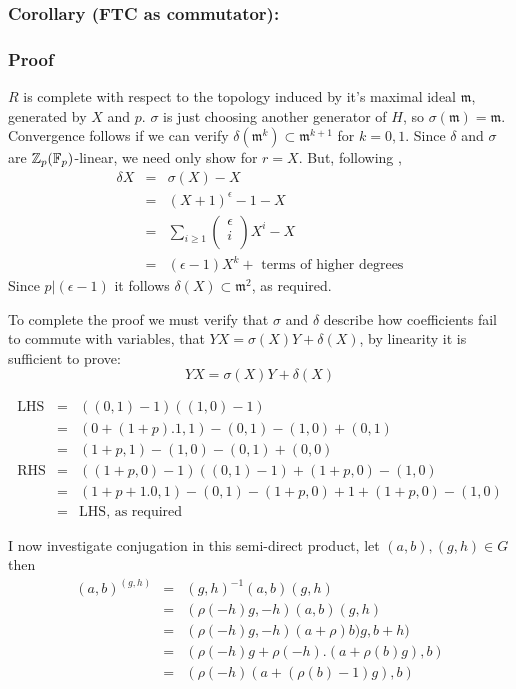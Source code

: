 \subsubsection{Corollary (FTC as commutator):} 

\subsubsection*{Proof}
$R$ is complete with respect to the topology induced by it's maximal ideal $\mathfrak m$, generated by $X$ and $p$. $\sigma$ is just choosing another generator of $H$, so $\sigma(\mathfrak m)= \mathfrak m$. Convergence follows if we can verify $\delta(\mathfrak m^k)\subset \mathfrak m^{k+1}$ for $k=0,1$. Since $\delta$ and $\sigma$ are $\mathbb Z_p (\mathbb F_p)$-linear, we need only show for $r=X$. But, following \cite{V},
\begin{eqnarray}
\nonumber \delta X &=& \sigma(X) - X\\
\nonumber               &=& (X+1)^\epsilon - 1- X\\
\nonumber    	       &=& \sum_{i\geq 1} \left( \begin{array}{c}\epsilon \\ i\\ \end{array}\right) X^i - X\\
\nonumber 	       &=& (\epsilon - 1) X^k +\text{ terms of higher degrees}
\end{eqnarray}
Since $p| (\epsilon - 1)$ it follows $\delta(X)\subset \mathfrak m ^2$, as required.

To complete the proof we must verify that $\sigma$ and $\delta$ describe how coefficients fail to commute with variables, that $YX = \sigma(X) Y + \delta(X)$, by linearity it is sufficient to prove:
$$YX = \sigma(X) Y + \delta (X)$$

\begin{eqnarray}
\nonumber \text{LHS} 	&=& ((0,1)-1)((1,0)-1)\\
\nonumber			&=& (0+(1+p).1,1) - (0,1) - (1,0) + (0,1)\\
\nonumber 			&=& (1+p,1) - (1,0) - (0,1) + (0,0)\\
\nonumber \text{RHS}	&=& ((1+p,0)-1)((0,1)-1)+(1+p,0)-(1,0)\\
\nonumber			&=& (1+p+1.0,1) - (0,1) - (1+p,0) +1+ (1+p,0) - (1,0)\\
\nonumber			&=& \text{LHS, as required}
\end{eqnarray}

I now investigate conjugation in this semi-direct product, let $(a,b),(g,h)\in G$ then
\begin{eqnarray}
\nonumber (a,b)^{(g,h)} 	&=& (g,h)^{-1} (a,b) (g,h)\\
\nonumber 			&=& (\rho(-h)g, -h) (a,b)(g,h)\\
\nonumber 			&=& (\rho(-h)g, -h) (a+\rho)b) g, b+h)\\
\nonumber			&=& (\rho(-h)g+\rho(-h).(a+\rho(b)g),b)\\
\nonumber 			&=& (\rho(-h) (a+(\rho(b)-1)g), b)
\end{eqnarray}

